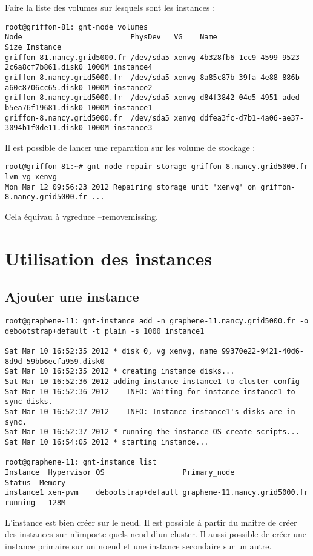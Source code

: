 Faire la liste des volumes sur lesquels sont les instances : 
\begin{lstlisting}
root@griffon-81: gnt-node volumes
Node                         PhysDev   VG    Name                                        Size Instance 
griffon-81.nancy.grid5000.fr /dev/sda5 xenvg 4b328fb6-1cc9-4599-9523-2c6a8cf7b861.disk0 1000M instance4
griffon-8.nancy.grid5000.fr  /dev/sda5 xenvg 8a85c87b-39fa-4e88-886b-a60c8706cc65.disk0 1000M instance2
griffon-8.nancy.grid5000.fr  /dev/sda5 xenvg d84f3842-04d5-4951-aded-b5ea76f19681.disk0 1000M instance1
griffon-8.nancy.grid5000.fr  /dev/sda5 xenvg ddfea3fc-d7b1-4a06-ae37-3094b1f0de11.disk0 1000M instance3
\end{lstlisting}
Il est possible de lancer une reparation sur les volume de stockage :
\begin{lstlisting}
root@griffon-81:~# gnt-node repair-storage griffon-8.nancy.grid5000.fr lvm-vg xenvg
Mon Mar 12 09:56:23 2012 Repairing storage unit 'xenvg' on griffon-8.nancy.grid5000.fr ...
\end{lstlisting}
Cela équivau à vgreduce --removemissing.



\section {Utilisation des instances}

\subsection {Ajouter une instance}
\begin{lstlisting}
root@graphene-11: gnt-instance add -n graphene-11.nancy.grid5000.fr -o debootstrap+default -t plain -s 1000 instance1

Sat Mar 10 16:52:35 2012 * disk 0, vg xenvg, name 99370e22-9421-40d6-8d9d-59bb6ecfa959.disk0
Sat Mar 10 16:52:35 2012 * creating instance disks...
Sat Mar 10 16:52:36 2012 adding instance instance1 to cluster config
Sat Mar 10 16:52:36 2012  - INFO: Waiting for instance instance1 to sync disks.
Sat Mar 10 16:52:37 2012  - INFO: Instance instance1's disks are in sync.
Sat Mar 10 16:52:37 2012 * running the instance OS create scripts...
Sat Mar 10 16:54:05 2012 * starting instance...

root@graphene-11: gnt-instance list
Instance  Hypervisor OS                  Primary_node                  Status  Memory
instance1 xen-pvm    debootstrap+default graphene-11.nancy.grid5000.fr running   128M
\end{lstlisting}
L'instance est bien créer sur le neud. Il est possible à partir du maitre de créer des instances sur n'importe quels neud d'un cluster. Il aussi possible de créer une instance primaire sur un noeud et une instance secondaire sur un autre.

